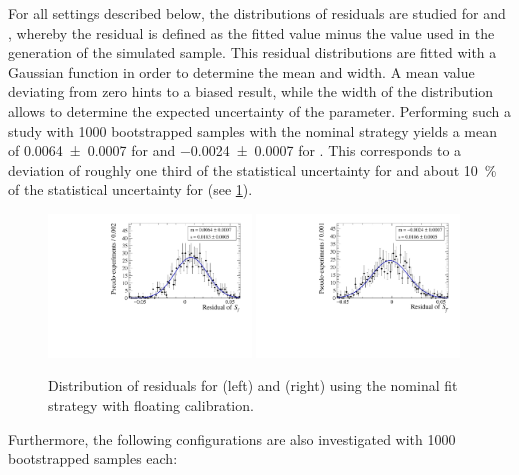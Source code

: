 For all settings described below, the distributions of residuals are studied for \Sf and \Sfbar, whereby the residual is defined as the fitted value minus the value used in the generation  of the simulated sample.
This residual distributions are fitted with a Gaussian function in order to determine the mean and width.
A mean value deviating from zero hints to a biased result, while the width of the distribution allows to determine the expected uncertainty of the parameter.
Performing such a study with \num{1000} bootstrapped samples with the nominal strategy yields a mean of \num{0.0064\pm0.0007} for \Sf and \num{-0.0024\pm0.0007} for \Sfbar.
This corresponds to a deviation of roughly one third of the statistical uncertainty for \Sf and about \SI{10}{\percent} of the statistical uncertainty for \Sfbar (see \cref{fig:BootstrapStudy}).
\begin{figure}[tbp]
    \centering
    \includegraphics[width=0.48\textwidth]{10TimeFit/figs/S_f_res.pdf}
    \includegraphics[width=0.48\textwidth]{10TimeFit/figs/S_fbar_res.pdf}
    \caption{Distribution of residuals for \Sf (left) and \Sfbar (right) using the nominal fit strategy with floating calibration.}
    \label{fig:BootstrapStudy}
\end{figure}
Furthermore, the following configurations are also investigated with \num{1000} bootstrapped samples each:
